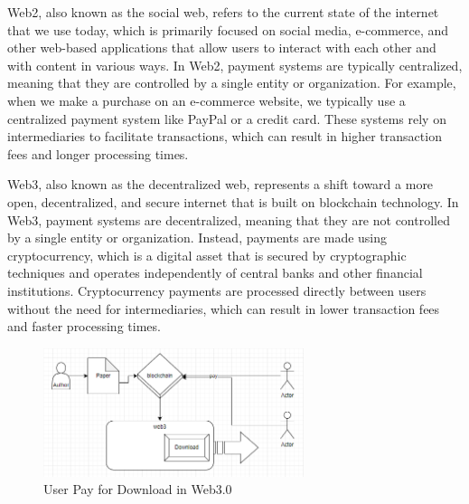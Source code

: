 \documentclass[lettersize,journal]{IEEEtran}
\begin{document}
Web2, also known as the social web, refers to the current state of the internet that we use today, which is primarily focused on social media, e-commerce, and other web-based applications that allow users to interact with each other and with content in various ways. In Web2, payment systems are typically centralized, meaning that they are controlled by a single entity or organization. For example, when we make a purchase on an e-commerce website, we typically use a centralized payment system like PayPal or a credit card. These systems rely on intermediaries to facilitate transactions, which can result in higher transaction fees and longer processing times.

Web3, also known as the decentralized web, represents a shift toward a more open, decentralized, and secure internet that is built on blockchain technology. In Web3, payment systems are decentralized, meaning that they are not controlled by a single entity or organization. Instead, payments are made using cryptocurrency, which is a digital asset that is secured by cryptographic techniques and operates independently of central banks and other financial institutions. Cryptocurrency payments are processed directly between users without the need for intermediaries, which can result in lower transaction fees and faster processing times.

\begin{figure}[h]
  \centering
  \includegraphics[width=3in]{assets/web3.png}
  \caption{User Pay for Download in Web3.0}
\end{figure}
\end{document}
